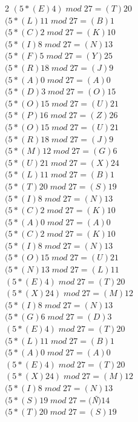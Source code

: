 \documentclass{article}
\begin{document}
\begin{enumerate}
\begin{multicols}{2}
$(5*(E)4) \; mod \; 27 = (T)20$ \\
$(5*(L)11 \; mod \; 27 = (B)1$ \\
$(5*(C)2 \; mod \; 27 = (K)10$\\
$(5*(I)8 \; mod \; 27 = (N)13$ \\
$(5*(F)5 \; mod \; 27 = (Y)25$ \\
$(5*(R)18 \; mod \; 27 = (J)9$ \\
$(5*(A)0 \; mod \; 27 = (A)0$ \\
$(5*(D)3 \; mod \; 27 = (O)15$ \\
$(5*(O)15 \; mod \; 27 = (U)21$ \\
$(5*(P)16 \; mod \; 27 = (Z)26$ \\
$(5*(O)15 \; mod \; 27 = (U)21$ \\
$(5*(R)18 \; mod \; 27 = (J)9$ \\
$(5*(M)12 \; mod \; 27 = (G)6$ \\
$(5*(U)21 \; mod \; 27 = (X)24$ \\
$(5*(L)11 \; mod \; 27 = (B)1$ \\
$(5*(T)20 \; mod \; 27 = (S)19$ \\
$(5*(I)8 \; mod \; 27 = (N)13$ \\
$(5*(C)2 \; mod \; 27 = (K)10$\\
$(5*(A)0 \; mod \; 27 = (A)0$ \\
$(5*(C)2 \; mod \; 27 = (K)10$\\
$(5*(I)8 \; mod \; 27 = (N)13$ \\
$(5*(O)15 \; mod \; 27 = (U)21$ \\
$(5*(N)13 \; mod \; 27 = (L)11$ \\
$(5*(E)4) \; mod \; 27 = (T)20$ \\
$(5*(X)24) \; mod \; 27 = (M)12$ \\
$(5*(I)8 \; mod \; 27 = (N)13$ \\
$(5*(G)6 \; mod \; 27 = (D)3$ \\
$(5*(E)4) \; mod \; 27 = (T)20$ \\
$(5*(L)11 \; mod \; 27 = (B)1$ \\
$(5*(A)0 \; mod \; 27 = (A)0$ \\
$(5*(E)4) \; mod \; 27 = (T)20$ \\
$(5*(X)24) \; mod \; 27 = (M)12$ \\
$(5*(I)8 \; mod \; 27 = (N)13$ \\
$(5*(S)19 \; mod \; 27 = ($\textit{Ñ}$)14$ \\
$(5*(T)20 \; mod \; 27 = (S)19$ \\

\end{multicols}
\end{enumerate}
\end{document}
